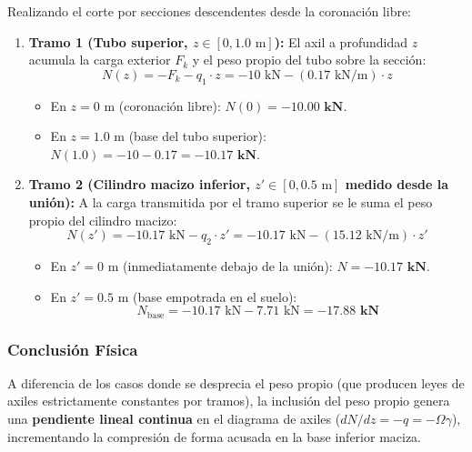 Realizando el corte por secciones descendentes desde la coronación libre:
\begin{enumerate}
    \item \textbf{Tramo 1 (Tubo superior, $z \in [0, 1.0\text{ m}]$):}
          El axil a profundidad $z$ acumula la carga exterior $F_k$ y el peso propio del tubo sobre la sección:
          \begin{equation}
              N(z) = - F_k - q_1 \cdot z = - 10\text{ kN} - (0.17\text{ kN/m}) \cdot z
          \end{equation}
          \begin{itemize}
              \item En $z = 0\text{ m}$ (coronación libre): $N(0) = \mathbf{-10.00\text{ kN}}$.
              \item En $z = 1.0\text{ m}$ (base del tubo superior): $N(1.0) = -10 - 0.17 = \mathbf{-10.17\text{ kN}}$.
          \end{itemize}

    \item \textbf{Tramo 2 (Cilindro macizo inferior, $z' \in [0, 0.5\text{ m}]$ medido desde la unión):}
          A la carga transmitida por el tramo superior se le suma el peso propio del cilindro macizo:
          \begin{equation}
              N(z') = - 10.17\text{ kN} - q_2 \cdot z' = - 10.17\text{ kN} - (15.12\text{ kN/m}) \cdot z'
          \end{equation}
          \begin{itemize}
              \item En $z' = 0\text{ m}$ (inmediatamente debajo de la unión): $N = \mathbf{-10.17\text{ kN}}$.
              \item En $z' = 0.5\text{ m}$ (base empotrada en el suelo):
                    \begin{equation}
                        N_{\text{base}} = - 10.17\text{ kN} - 7.71\text{ kN} = \mathbf{-17.88\text{ kN}}
                    \end{equation}
          \end{itemize}
\end{enumerate}

\subsubsection*{Conclusión Física}
A diferencia de los casos donde se desprecia el peso propio (que producen leyes de axiles estrictamente constantes por tramos), la inclusión del peso propio genera una \textbf{pendiente lineal continua} en el diagrama de axiles ($dN/dz = -q = -\Omega \gamma$), incrementando la compresión de forma acusada en la base inferior maciza.

